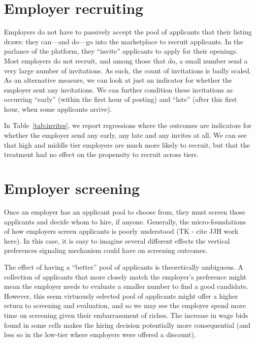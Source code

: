  

\section{Employer recruiting \label{sec:employer_recruiting}} 
Employers do not have to passively accept the pool of applicants that their listing draws: 
they can---and do---go into the marketplace to recruit applicants. 
In the parlance of the platform, they ``invite'' applicants to apply for their openings. 
Most employers do not recruit, and among those that do, a small number send a very large number of invitations. 
As such, the count of invitations is badly scaled. 
As an alternative measure, we can look at just an indicator for whether the employer sent any invitations. 
We can further condition these invitations as occurring ``early'' (within the first hour of posting) and ``late'' (after this first hour, when some applicants arrive). 

 

In Table~\ref{tab:invites}, we report regressions where the outcomes are indicators for whether the employer send any early, any late and any invites at all. 
We can see that high and middle tier employers are much more likely to recruit, but that the treatment had no effect on the propensity to recruit across tiers.

\section{Employer screening \label{sec:screening}}
Once an employer has an applicant pool to choose from, they must screen those applicants and decide whom to hire, if anyone.
Generally, the micro-foundations of how employers screen applicants is poorly understood (TK - cite JJH work here).
In this case, it is easy to imagine several different effects the vertical preferences signaling mechanism could have on screening outcomes.

The effect of having a ``better'' pool of applicants is theoretically ambiguous.
A collection of applicants that more closely match the employer's preference might mean the employer needs to evaluate a smaller number to find a good candidate. 
However, this seem virtuously selected pool of applicants might offer a higher return to screening and evaluation, and so we may see the employer spend more time on screening given their embarrassment of riches. 
The increase in wage bids found in some cells makes the hiring decision potentially more consequential (and less so in the low-tier where employers were offered a discount). 


